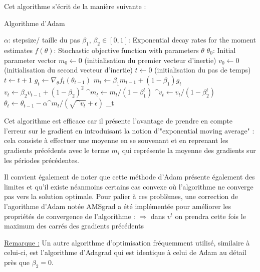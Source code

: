 \documentclass{article}
\begin{document}
Cet algorithme s'écrit de la manière suivante :

\bigskip

\begin{algorithm}
\caption{Algorithme d'Adam}
\begin{algorithmic}[1]
\REQUIRE $\alpha$: stepsize/ taille du pas
\REQUIRE $\beta_1$, $\beta_2 \in [0,1]$: Exponential decay rates for the moment estimates
\REQUIRE $f(\theta)$: Stochastic objective function with parameters $\theta$
\REQUIRE $\theta_0$: Initial parameter vector
\State $m_0 \leftarrow 0$ (initialisation du premier vecteur d'inertie)
\State $v_0 \leftarrow 0$ (initialisation du second vecteur d'inertie)
\State $t \leftarrow 0$ (initialisation du pas de temps)
  \State $t \leftarrow t+1$
  \State $g_t \leftarrow \nabla _\theta f_t(\theta _{t-1})$
  \State $m_t \leftarrow \beta_1 m_{t-1} + (1-\beta_1) g_t$
  \State $v_t \leftarrow \beta_2 v_{t-1} + (1-\beta_2) ^2$
  \State $\^m_t \leftarrow m_{t}/(1- \beta_1^t)$
  \State $\^v_t \leftarrow v_{t}/(1- \beta_2^t)$
  \State $\theta_t \leftarrow \theta_{t-1} - \alpha \^m_t /(\sqrt{\^v_t}+\epsilon)$
\EndWhile
\RETURN \theta_t 
\end{algorithmic}
\end{algorithm}



\bigskip

Cet algorithme est efficace car il présente l'avantage de prendre en compte l'erreur sur le gradient en introduisant la notion d'"exponential moving average" : cela consiste à effectuer une moyenne en se souvenant et en reprenant les gradients précédents avec le terme $m_i$ qui représente la moyenne des gradients sur les périodes précédentes.

\bigskip
Il convient également de noter que cette méthode d'Adam présente également des limites et qu'il existe néanmoins certains cas convexe où l'algorithme ne converge pas vers la solution optimale.
Pour palier à ces problèmes, une correction de l'agorithme d'Adam notée AMSgrad a été implémentée pour améliorer les propriétés de convergence de l'algorithme : $\Rightarrow$ dans $v^t$ on prendra cette fois le maximum des carrés des gradients précédents

\bigskip

\underline{Remarque :} Un autre algorithme d'optimisation fréquemment utilisé, similaire à celui-ci, est l'algorithme d'Adagrad qui est identique à celui de Adam au détail près que $\beta_2=0$.
\end{document}
